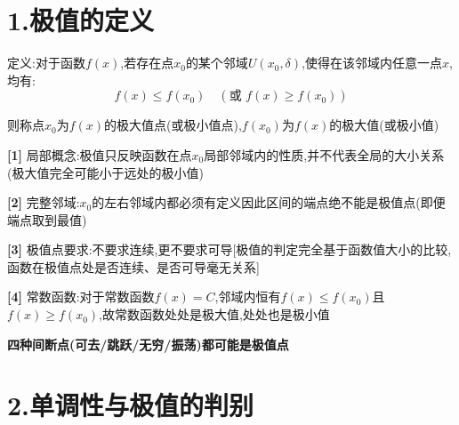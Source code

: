 \documentclass[11pt,a4paper,UTF8]{ctexart}
\begin{document}
\pagestyle{fancy}
\fancyhf{}
\fancyhead[R]{\small\color{TitlePurple}\nouppercase{\leftmark}}
\renewcommand{\headrulewidth}{0.5pt}

\tableofcontents
\newpage
{}



\section{1.极值的定义}

定义:对于函数$f(x)$,若存在点$x_0$的某个邻域$U(x_0, \delta)$,使得在该邻域内任意一点$x$,均有:
\begin{equation*}
f(x) \le f(x_0) \quad (\text{或 } f(x) \ge f(x_0))
\end{equation*}


则称点$x_0$为$f(x)$的极大值点(或极小值点),$f(x_0)$为$f(x)$的极大值(或极小值)

\textbf{[1]} 局部概念:极值只反映函数在点$x_0$局部邻域内的性质,并不代表全局的大小关系(极大值完全可能小于远处的极小值)

\textbf{[2]} 完整邻域:$x_0$的左右邻域内都必须有定义因此区间的端点绝不能是极值点(即便端点取到最值)

\textbf{[3]} 极值点要求:不要求连续,更不要求可导[极值的判定完全基于函数值大小的比较,函数在极值点处是否连续、是否可导毫无关系]

\textbf{[4]} 常数函数:对于常数函数$f(x) = C$,邻域内恒有$f(x) \le f(x_0)$且$f(x) \ge f(x_0)$,故常数函数处处是极大值,处处也是极小值

\textbf{四种间断点(可去/跳跃/无穷/振荡)都可能是极值点}


\section{2.单调性与极值的判别}
\end{document}
